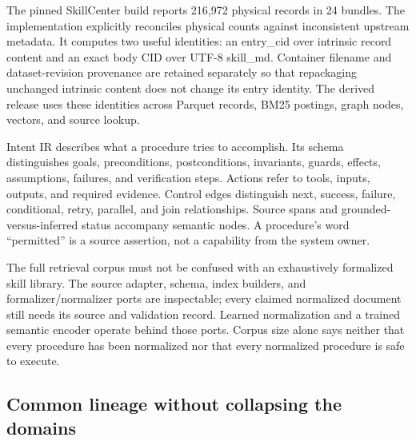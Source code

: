 \documentclass{article}
\begin{document}
The pinned SkillCenter build reports 216,972 physical records in 24 bundles. The implementation explicitly reconciles physical counts against inconsistent upstream metadata. It computes two useful identities: an entry\_\allowbreak{}cid over intrinsic record content and an exact body CID over UTF-8 skill\_\allowbreak{}md. Container filename and dataset-revision provenance are retained separately so that repackaging unchanged intrinsic content does not change its entry identity. The derived release uses these identities across Parquet records, BM25 postings, graph nodes, vectors, and source lookup.

Intent IR describes what a procedure tries to accomplish. Its schema distinguishes goals, preconditions, postconditions, invariants, guards, effects, assumptions, failures, and verification steps. Actions refer to tools, inputs, outputs, and required evidence. Control edges distinguish next, success, failure, conditional, retry, parallel, and join relationships. Source spans and grounded-versus-inferred status accompany semantic nodes. A procedure's word ``permitted'' is a source assertion, not a capability from the system owner.

The full retrieval corpus must not be confused with an exhaustively formalized skill library. The source adapter, schema, index builders, and formalizer/normalizer ports are inspectable; every claimed normalized document still needs its source and validation record. Learned normalization and a trained semantic encoder operate behind those ports. Corpus size alone says neither that every procedure has been normalized nor that every normalized procedure is safe to execute.

\subsection{Common lineage without collapsing the domains}
\end{document}
